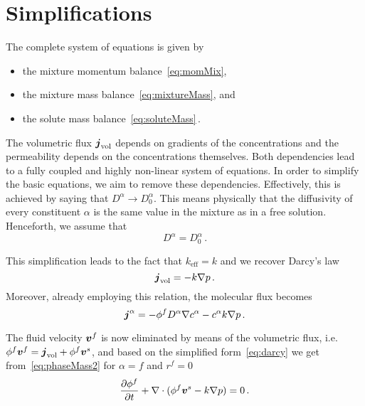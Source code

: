 \documentclass[a4paper,DIV=12,10pt]{scrartcl}
\newcommand{\V}[0]{\vek{v}}
\begin{document}
\section{Simplifications}
\label{sec:simple}

The complete system of equations is given by 
\begin{itemize}
\item the mixture momentum balance~\eqref{eq:momMix},
\item the mixture mass balance~\eqref{eq:mixtureMass}, and
\item the solute mass balance~\eqref{eq:soluteMass}\,.
\end{itemize}


The volumetric flux $\boldsymbol{j}_{\text{vol}}$ depends on gradients of the
concentrations and the permeability depends on the concentrations
themselves. Both dependencies lead to a fully coupled and highly non-linear
system of equations. In order to simplify the basic equations, we aim to
remove these dependencies. Effectively, this is achieved by saying that
 $D^\alpha \to D^\alpha_0$.
 This means physically that the diffusivity of every constituent $\alpha$ is
the same value in the mixture as in a free solution. Henceforth, we assume
that
\begin{equation}
  \label{eq:diffusivity}
  D^\alpha = D^\alpha_0\,.
\end{equation}

This simplification leads to the fact that $k_{\text{eff}} = k$ and we recover
Darcy's law
\begin{equation}
  \label{eq:darcy}
  \boldsymbol{j}_{\text{vol}} = - k \nabla p \,.
\end{equation}
Moreover, already employing this relation, the molecular flux becomes
\begin{equation}
  \label{eq:molecularFlux2}
  \boldsymbol{j}^\alpha = -\phi^f D^\alpha \nabla c^\alpha - c^\alpha k \nabla p\,.
\end{equation}

The fluid velocity $\V^f$ is now eliminated by means of the volumetric flux,
i.e. $\phi^f \V^f = \vek{j}_{\text{vol}} + \phi^f \V^s$, and based on the
simplified form~\eqref{eq:darcy} we get from~\eqref{eq:phaseMass2} for
$\alpha = f$ and $r^f = 0$
\begin{equation}
  \label{eq:fluidMass2}
  \frac{\partial \phi^f}{\partial t} + \nabla \cdot (\phi^f \V^s - k \nabla p) = 0\,.
\end{equation}
\end{document}
